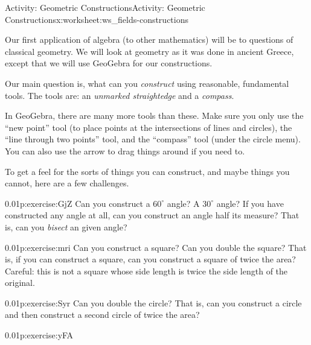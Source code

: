 \documentclass[11pt]{book}
\begin{document}
%
%
\typeout{************************************************}
\typeout{************************************************}
%
\begin{worksheet-subsection}{Activity: Geometric Constructions}{}{Activity: Geometric Constructions}{}{}{x:worksheet:ws_fields-constructions}
\begin{introduction}{}%
Our first application of algebra (to other mathematics) will be to questions of classical geometry.  We will look at geometry as it was done in ancient Greece, except that we will use GeoGebra for our constructions.%
\par
Our main question is, what can you \emph{construct} using reasonable, fundamental tools.  The tools are: an \emph{unmarked straightedge} and a \emph{compass}.%
\par
In GeoGebra, there are many more tools than these. Make sure you only use the ``new point'' tool (to place points at the intersections of lines and circles), the ``line through two points'' tool, and the ``compass'' tool (under the circle menu).  You can also use the arrow to drag things around if you need to.%
\par
To get a feel for the sorts of things you can construct, and maybe things you cannot, here are a few challenges.%
\end{introduction}%
\begin{divisionexercise}{1}{}{0.01}{p:exercise:GjZ}%
Can you construct a \(60^\circ\) angle?  A \(30^\circ\) angle?  If you have constructed any angle at all, can you construct an angle half its measure?  That is, can you \emph{bisect} an given angle?%
\end{divisionexercise}%
\begin{divisionexercise}{2}{}{0.01}{p:exercise:mri}%
Can you construct a square?  Can you double the square?  That is, if you can construct a square, can you construct a square of twice the area?  Careful: this is not a square whose side length is twice the side length of the original.%
\end{divisionexercise}%
\begin{divisionexercise}{3}{}{0.01}{p:exercise:Syr}%
Can you double the circle?  That is, can you construct a circle and then construct a second circle of twice the area?%
\end{divisionexercise}%
\begin{divisionexercise}{4}{}{0.01}{p:exercise:yFA}%

\end{divisionexercise}
\end{worksheet-subsection}
\end{document}
